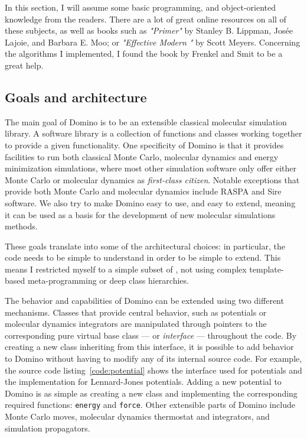 \documentclass[thesis]{subfiles}
\begin{document}
In this section, I will assume some basic programming, \cxx and object-oriented
knowledge from the readers. There are a lot of great online resources on all of
these subjects, as well as books such as \emph{"\cxx Primer"} by Stanley B.
Lippman, Josée Lajoie, and Barbara E. Moo; or \emph{"Effective Modern \cxx"} by
Scott Meyers. Concerning the algorithms I implemented, I found the book by
Frenkel and Smit\cite{Frenkel2002} to be a great help.

\subsection{Goals and architecture}

The main goal of Domino is to be an extensible classical molecular simulation
library. A software library is a collection of functions and classes working
together to provide a given functionality. One specificity of Domino is that it
provides facilities to run both classical Monte Carlo, molecular dynamics and
energy minimization simulations, where most other simulation software only offer
either Monte Carlo or molecular dynamics as \emph{first-class citizen}. Notable
exceptions that provide both Monte Carlo and molecular dynamics include
RASPA\cite{Dubbeldam2015} and Sire\cite{SireMol} software. We also try
to make Domino easy to use, and easy to extend, meaning it can be used as a
basis for the development of new molecular simulations methods.

These goals translate into some of the architectural choices: in particular, the
code needs to be simple to understand in order to be simple to extend. This means
I restricted myself to a simple subset of \cxx, not using complex template-based
meta-programming or deep class hierarchies.

The behavior and capabilities of Domino can be extended using two different
mechanisms. Classes that provide central behavior, such as potentials or
molecular dynamics integrators are manipulated through pointers to the
corresponding pure virtual base class --- or \emph{interface} --- throughout the
code. By creating a new class inheriting from this interface, it is possible to
add behavior to Domino without having to modify any of its internal source code.
For example, the source code listing~\ref{code:potential} shows the interface
used for potentials and the implementation for Lennard-Jones potentials. Adding
a new potential to Domino is as simple as creating a new class and implementing
the corresponding required functions: \texttt{energy} and \texttt{force}. Other
extensible parts of Domino include Monte Carlo moves, molecular dynamics
thermostat and integrators, and simulation propagators.
\end{document}
